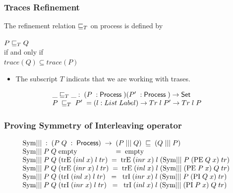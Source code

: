 \documentclass{beamer}
\newcommand{\ar}{\rightarrow}
\newcommand{\Set}{\mathsf{Set}}
\newcommand{\Process}{\mathsf{Process}}
\newcommand{\emptyC}{\mathrm{empty}}
\newcommand{\extChoice}{\mathrm{trE}}
\newcommand{\intChoice}{\mathrm{trI}}
\newcommand{\Sym}{\mathrm{Sym}}
\newcommand{\pii}{\mathrm{PI}}
\newcommand{\pe}{\mathrm{PE}}
\begin{document}
\begin{frame}
\frametitle{Traces Refinement}

The refinement relation $\refinedby_T$ on process is defined by 
\begin{center}
$P\refinedby_T Q$\\
if and only if \\
$trace(Q)\subseteq trace(P)$
\end{center}
%
\begin{itemize}

\item The subscript $T$ indicats that we are working with trases.

\end{itemize}

\[\begin{array}[t]{@{}lcl} 
\_\refinedby_T\_ :\; (P\;: \Process \; ) (P'\;: \Process \; )\ar \Set  \\
P \;\refinedby_T \;P' \; = (l : List \; Label) \ar Tr \; l \; P' \ar Tr \; l \; P\\



\end{array} \]



\end{frame}


\begin{frame}

\frametitle{ Proving Symmetry of Interleaving operator }


\[\begin{array}[t]{@{}lcl} 
\Sym||| \; : \; (P\; Q\; :\; \Process) \; \ar\; (P \; ||| \; Q) \; \refinedby \; (Q \; ||| \; P)   \\
 
 \Sym|||\;  P\; Q\; \emptyC \; \; \; \; \; \; \; \; \; \; \; \; \; \; \; \; \; \; \;  =\; \emptyC \\ 
 \Sym|||\; P\; Q\; (\extChoice\; (inl\; x)\; l\; tr)\; =\; \extChoice\; (inr\; x)\; l \; (\Sym|||\; P\; (\pe\; Q\; x)\; tr) \\
 \Sym|||\; P\; Q\; (\extChoice\; (inr\; x)\; l\; tr)\; =\; \extChoice\; (inl\; x)\; l\; (\Sym|||\; (\pe\; P\; x)\; Q\; tr)\; \\
 \Sym|||\; P\; Q\; (\intChoice\; (inl\; x)\; l\; tr)\; \; =\; \; \intChoice\; (inr\; x)\; l\; (\Sym|||\; P\; (\pii\; Q\; x)\; tr)\; \\
 \Sym|||\; P\; Q\; (\intChoice\; (inr\; x)\; l\; tr)\; \; =\; \; \intChoice\; (inl\; x)\; l\; (\Sym|||\; (\pii\; P\; x)\; Q\; tr) \\
 
\end{array} \]

\end{frame}
\end{document}
